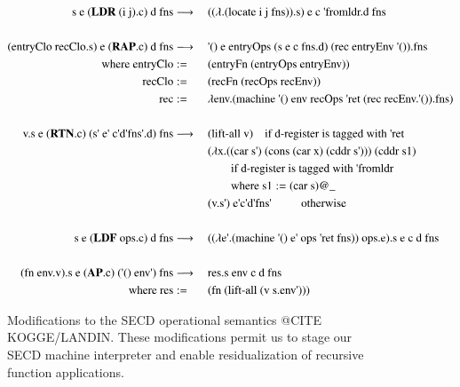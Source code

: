 \documentclass{article}
\theoremstyle{definition}
\newcommand{\ts}{\textquotesingle}
\begin{document}
\begin{figure}[ht]
\centering
\begin{alignat}{5}
		\text{s e (} \mathbf{LDR} \text{ (i j).c) d fns} & \longrightarrow \: && \text{(($\lambda$.(locate i j fns)).s) e c {\ts}fromldr.d fns} \\
		\nonumber \\%
		\text{(entryClo recClo.s) e (} \mathbf{RAP}\text{.c) d fns} & \longrightarrow \: && \text{{\ts}() e entryOps (s e c fns.d) (rec entryEnv {\ts}()).fns} \\
		\text{where entryClo} & := && \text{(entryFn (entryOps entryEnv))} \nonumber \\
		\text{recClo} & := && \text{(recFn (recOps recEnv))} \nonumber \\
		\text{rec} & := && \text{$\lambda$env.(machine {\ts}() env recOps {\ts}ret (rec recEnv.{\ts}()).fns)} \nonumber
		\nonumber \\%
		\nonumber \\%
		\text{v.s e (} \mathbf{RTN}\text{.c) (s{\ts} e{\ts} c\ts  d\ts  fns\ts.d) fns} & \longrightarrow \:
		 && \text{(lift-all v)} 									\quad	\text{if d-register is tagged with {\ts}ret}	\\
		 & && \text{($\lambda$x.((car s{\ts}) (cons (car x) (cddr s{\ts}))) (cddr s1)	} \nonumber \\
		 & && \qquad\text{if d-register is tagged with {\ts}fromldr} \nonumber \\
		 & && \qquad\text{where s1} := \text{(car s)@\_} \nonumber \\
 		 & && \text{(v.s\ts)  e\ts  c\ts  d\ts  fns\ts}	\qquad\;\;\text{otherwise} \nonumber \\
 		\nonumber \\%
		\text{s e (} \mathbf{LDF} \text{ ops.c) d fns} & \longrightarrow \: && \text{(($\lambda$e{\ts}.(machine {\ts}() e{\ts} ops {\ts}ret fns)) ops.e).s e c d fns} \\
		\nonumber \\%
		\text{(fn env.v).s e (} \mathbf{AP}\text{.c) ({\ts}() env{\ts}) fns} & \longrightarrow \: && \text{res.s env c d fns} \\
		\text{where res} & := && \text{(fn (lift-all (v s.env{\ts})))} \nonumber
\end{alignat}
\caption{Modifications to the SECD operational semantics @CITE KOGGE/LANDIN. These modifications permit us to stage our SECD machine interpreter and enable residualization of recursive function applications.}
\label{fig:secd_semantics}
\end{figure}
\end{document}
